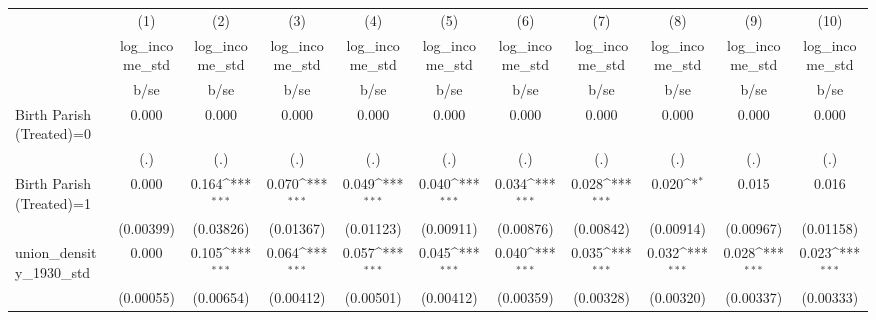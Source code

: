 {
\def\sym#1{\ifmmode^{#1}\else\(^{#1}\)\fi}
\begin{tabular}{l*{10}{c}}
\hline\hline
                    &\multicolumn{1}{c}{(1)}&\multicolumn{1}{c}{(2)}&\multicolumn{1}{c}{(3)}&\multicolumn{1}{c}{(4)}&\multicolumn{1}{c}{(5)}&\multicolumn{1}{c}{(6)}&\multicolumn{1}{c}{(7)}&\multicolumn{1}{c}{(8)}&\multicolumn{1}{c}{(9)}&\multicolumn{1}{c}{(10)}\\
                    &\multicolumn{1}{c}{log\_income\_std}&\multicolumn{1}{c}{log\_income\_std}&\multicolumn{1}{c}{log\_income\_std}&\multicolumn{1}{c}{log\_income\_std}&\multicolumn{1}{c}{log\_income\_std}&\multicolumn{1}{c}{log\_income\_std}&\multicolumn{1}{c}{log\_income\_std}&\multicolumn{1}{c}{log\_income\_std}&\multicolumn{1}{c}{log\_income\_std}&\multicolumn{1}{c}{log\_income\_std}\\
                    &        b/se         &        b/se         &        b/se         &        b/se         &        b/se         &        b/se         &        b/se         &        b/se         &        b/se         &        b/se         \\
\hline
Birth Parish (Treated)=0&       0.000         &       0.000         &       0.000         &       0.000         &       0.000         &       0.000         &       0.000         &       0.000         &       0.000         &       0.000         \\
                    &         (.)         &         (.)         &         (.)         &         (.)         &         (.)         &         (.)         &         (.)         &         (.)         &         (.)         &         (.)         \\
Birth Parish (Treated)=1&       0.000         &       0.164\sym{***}&       0.070\sym{***}&       0.049\sym{***}&       0.040\sym{***}&       0.034\sym{***}&       0.028\sym{***}&       0.020\sym{*}  &       0.015         &       0.016         \\
                    &   (0.00399)         &   (0.03826)         &   (0.01367)         &   (0.01123)         &   (0.00911)         &   (0.00876)         &   (0.00842)         &   (0.00914)         &   (0.00967)         &   (0.01158)         \\
union\_density\_1930\_std&       0.000         &       0.105\sym{***}&       0.064\sym{***}&       0.057\sym{***}&       0.045\sym{***}&       0.040\sym{***}&       0.035\sym{***}&       0.032\sym{***}&       0.028\sym{***}&       0.023\sym{***}\\
                    &   (0.00055)         &   (0.00654)         &   (0.00412)         &   (0.00501)         &   (0.00412)         &   (0.00359)         &   (0.00328)         &   (0.00320)         &   (0.00337)         &   (0.00333)         \\

\end{tabular}}
